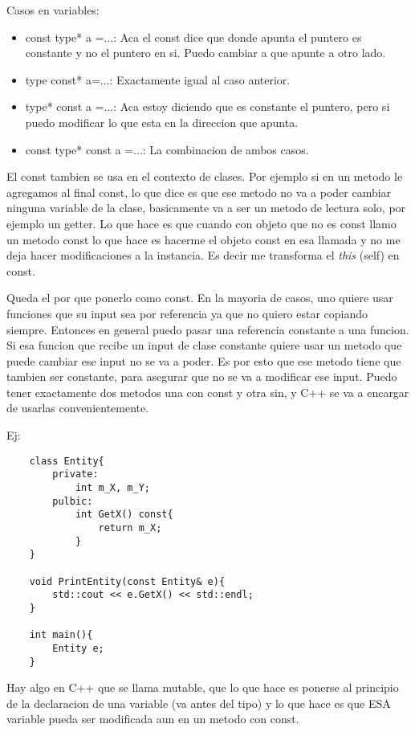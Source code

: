 \documentclass[11pt]{article}
\begin{document}
Casos en variables:
\begin{itemize}
    \item const type* a =...: Aca el const dice que donde apunta el puntero es constante
            y no el puntero en si. Puedo cambiar a que apunte a otro lado.
    \item type const* a=...: Exactamente igual al caso anterior.
    \item type* const a =...: Aca estoy diciendo que es constante el puntero, pero si
        puedo modificar lo que esta en la  direccion que apunta.
    \item const type* const a =...: La combinacion de ambos casos.
\end{itemize}

El const tambien se usa en el contexto de clases.
Por ejemplo si en un metodo le agregamos al final const, lo que dice es que ese
metodo no va a poder cambiar ninguna variable de la clase, basicamente va a ser
un metodo de lectura solo, por ejemplo un getter.
Lo que hace es que cuando con objeto que no es const llamo un metodo const lo que hace
es hacerme el objeto const en esa llamada y no me deja hacer modificaciones
a la instancia.
Es decir me transforma el \textit{this} (self)  en const.

Queda el por que ponerlo como const.
En la mayoria de casos, uno quiere usar funciones que su input sea por referencia
ya que no quiero estar copiando siempre.
Entonces en general puedo pasar una referencia constante a una funcion.
Si esa funcion que recibe un input de clase constante quiere usar un metodo
que puede cambiar ese input no se va a poder.
Es por esto que ese metodo tiene que tambien ser constante, para asegurar
que no se va a modificar ese input.
Puedo tener exactamente dos metodos una con const y otra sin, y C++
se va a encargar de usarlas convenientemente.

Ej:
\begin{lstlisting}
    class Entity{
        private:
            int m_X, m_Y;
        pulbic:
            int GetX() const{
                return m_X;
            }
    }

    void PrintEntity(const Entity& e){
        std::cout << e.GetX() << std::endl;
    }

    int main(){
        Entity e;
    }
\end{lstlisting}

Hay algo en C++ que se llama mutable, que lo que hace es ponerse al principio de
la declaracion de una variable (va antes del tipo) y lo que hace es que ESA variable
pueda ser modificada aun en un metodo con const.
\end{document}
